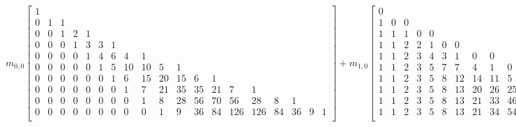 \begin{sidewaystable}
\begin{equation}
\end{equation}
\begin{equation}
m_{0,0}\left[\begin{array}{ccccccccccccccccccc}
1 &  &  &  &  &  &  &  &  &  &  &  &  &  &  &  &  &  &  \\
0 & 1 & 1 &  &  &  &  &  &  &  &  &  &  &  &  &  &  &  &  \\
0 & 0 & 1 & 2 & 1 &  &  &  &  &  &  &  &  &  &  &  &  &  &  \\
0 & 0 & 0 & 1 & 3 & 3 & 1 &  &  &  &  &  &  &  &  &  &  &  &  \\
0 & 0 & 0 & 0 & 1 & 4 & 6 & 4 & 1 &  &  &  &  &  &  &  &  &  &  \\
0 & 0 & 0 & 0 & 0 & 1 & 5 & 10 & 10 & 5 & 1 &  &  &  &  &  &  &  &  \\
0 & 0 & 0 & 0 & 0 & 0 & 1 & 6 & 15 & 20 & 15 & 6 & 1 &  &  &  &  &  &  \\
0 & 0 & 0 & 0 & 0 & 0 & 0 & 1 & 7 & 21 & 35 & 35 & 21 & 7 & 1 &  &  &  &  \\
0 & 0 & 0 & 0 & 0 & 0 & 0 & 0 & 1 & 8 & 28 & 56 & 70 & 56 & 28 & 8 & 1 &  &  \\
0 & 0 & 0 & 0 & 0 & 0 & 0 & 0 & 0 & 1 & 9 & 36 & 84 & 126 & 126 & 84 & 36 & 9 & 1 \\
\end{array}\right] + m_{1,0}\left[\begin{array}{ccccccccccccccccccc}
0 &  &  &  &  &  &  &  &  &  &  &  &  &  &  &  &  &  &  \\
1 & 0 & 0 &  &  &  &  &  &  &  &  &  &  &  &  &  &  &  &  \\
1 & 1 & 1 & 0 & 0 &  &  &  &  &  &  &  &  &  &  &  &  &  &  \\
1 & 1 & 2 & 2 & 1 & 0 & 0 &  &  &  &  &  &  &  &  &  &  &  &  \\
1 & 1 & 2 & 3 & 4 & 3 & 1 & 0 & 0 &  &  &  &  &  &  &  &  &  &  \\
1 & 1 & 2 & 3 & 5 & 7 & 7 & 4 & 1 & 0 & 0 &  &  &  &  &  &  &  &  \\
1 & 1 & 2 & 3 & 5 & 8 & 12 & 14 & 11 & 5 & 1 & 0 & 0 &  &  &  &  &  &  \\
1 & 1 & 2 & 3 & 5 & 8 & 13 & 20 & 26 & 25 & 16 & 6 & 1 & 0 & 0 &  &  &  &  \\
1 & 1 & 2 & 3 & 5 & 8 & 13 & 21 & 33 & 46 & 51 & 41 & 22 & 7 & 1 & 0 & 0 &  &  \\
1 & 1 & 2 & 3 & 5 & 8 & 13 & 21 & 34 & 54 & 79 & 97 & 92 & 63 & 29 & 8 & 1 & 0 & 0 \\
\end{array}\right]

\end{equation}
\end{sidewaystable}
